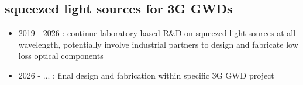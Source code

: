\subsection*{squeezed light sources for 3G GWDs}
\begin{itemize}
	\item 2019 - 2026 : continue laboratory based R\&D on squeezed light sources at all wavelength, potentially involve industrial partners to design and fabricate low loss optical components
	\item 2026 - ... : final design and fabrication within specific 3G GWD project
\end{itemize}



